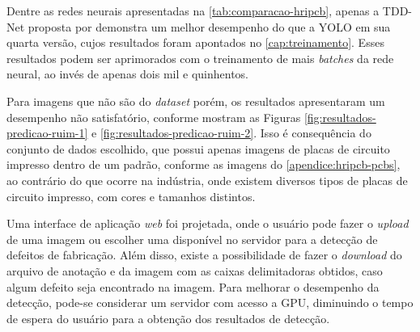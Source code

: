Dentre as redes neurais apresentadas na \autoref{tab:comparacao-hripcb}, apenas a TDD-Net proposta por  demonstra um melhor desempenho do que a YOLO em sua quarta versão, cujos resultados foram apontados no \autoref{cap:treinamento}. Esses resultados podem ser aprimorados com o treinamento de mais \textit{batches} da rede neural, ao invés de apenas dois mil e quinhentos.

Para imagens que não são do \textit{dataset} porém, os resultados apresentaram um desempenho não satisfatório, conforme mostram as Figuras \ref{fig:resultados-predicao-ruim-1} e \ref{fig:resultados-predicao-ruim-2}. Isso é consequência do conjunto de dados escolhido, que possui apenas imagens de placas de circuito impresso dentro de um padrão, conforme as imagens do \autoref{apendice:hripcb-pcbs}, ao contrário do que ocorre na indústria, onde existem diversos tipos de placas de circuito impresso, com cores e tamanhos distintos.

Uma interface de aplicação \textit{web} foi projetada, onde o usuário pode fazer o \textit{upload} de uma imagem ou escolher uma disponível no servidor para a detecção de defeitos de fabricação. Além disso, existe a possibilidade de fazer o \textit{download} do arquivo de anotação e da imagem com as caixas delimitadoras obtidos, caso algum defeito seja encontrado na imagem. Para melhorar o desempenho da detecção, pode-se considerar um servidor com acesso a GPU, diminuindo o tempo de espera do usuário para a obtenção dos resultados de detecção.

